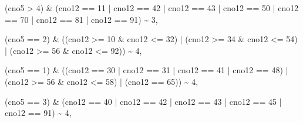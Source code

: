 \documentclass[
]{book}
\newenvironment{Shaded}{\begin{snugshade}}{\end{snugshade}}
\newcommand{\DecValTok}[1]{\textcolor[rgb]{0.00,0.00,0.81}{#1}}
\newcommand{\NormalTok}[1]{#1}
\newcommand{\SpecialCharTok}[1]{\textcolor[rgb]{0.00,0.00,0.00}{#1}}
\begin{document}
\begin{Shaded}
\begin{Highlighting}[]
\NormalTok{                        (cno5 }\SpecialCharTok{\textgreater{}} \DecValTok{4}\NormalTok{) }\SpecialCharTok{\&}\NormalTok{ (cno12 }\SpecialCharTok{==} \DecValTok{11} \SpecialCharTok{|}\NormalTok{ cno12 }\SpecialCharTok{==} \DecValTok{42} \SpecialCharTok{|}\NormalTok{ cno12 }\SpecialCharTok{==} \DecValTok{43} \SpecialCharTok{|} 
\NormalTok{                        cno12 }\SpecialCharTok{==} \DecValTok{50} \SpecialCharTok{|}\NormalTok{ cno12 }\SpecialCharTok{==} \DecValTok{70} \SpecialCharTok{|}\NormalTok{ cno12 }\SpecialCharTok{==} \DecValTok{81} \SpecialCharTok{|}\NormalTok{ cno12 }\SpecialCharTok{==} \DecValTok{91}\NormalTok{) }\SpecialCharTok{\textasciitilde{}} \DecValTok{3}\NormalTok{,}
                        
\NormalTok{                        (cno5 }\SpecialCharTok{==} \DecValTok{2}\NormalTok{) }\SpecialCharTok{\&}\NormalTok{ ((cno12 }\SpecialCharTok{\textgreater{}=} \DecValTok{10} \SpecialCharTok{\&}\NormalTok{ cno12 }\SpecialCharTok{\textless{}=} \DecValTok{32}\NormalTok{) }\SpecialCharTok{|}\NormalTok{ (cno12 }\SpecialCharTok{\textgreater{}=} \DecValTok{34} \SpecialCharTok{\&}\NormalTok{ cno12 }\SpecialCharTok{\textless{}=} \DecValTok{54}\NormalTok{) }\SpecialCharTok{|} 
\NormalTok{                        (cno12 }\SpecialCharTok{\textgreater{}=} \DecValTok{56} \SpecialCharTok{\&}\NormalTok{ cno12 }\SpecialCharTok{\textless{}=} \DecValTok{92}\NormalTok{)) }\SpecialCharTok{\textasciitilde{}} \DecValTok{4}\NormalTok{,}
                        
\NormalTok{                        (cno5 }\SpecialCharTok{==} \DecValTok{1}\NormalTok{) }\SpecialCharTok{\&}\NormalTok{ ((cno12 }\SpecialCharTok{==} \DecValTok{30} \SpecialCharTok{|}\NormalTok{ cno12 }\SpecialCharTok{==} \DecValTok{31} \SpecialCharTok{|}\NormalTok{ cno12 }\SpecialCharTok{==} \DecValTok{41} \SpecialCharTok{|}\NormalTok{ cno12 }\SpecialCharTok{==} \DecValTok{48}\NormalTok{) }\SpecialCharTok{|} 
\NormalTok{                        (cno12 }\SpecialCharTok{\textgreater{}=} \DecValTok{56} \SpecialCharTok{\&}\NormalTok{ cno12 }\SpecialCharTok{\textless{}=} \DecValTok{58}\NormalTok{) }\SpecialCharTok{|}\NormalTok{ (cno12 }\SpecialCharTok{==} \DecValTok{65}\NormalTok{)) }\SpecialCharTok{\textasciitilde{}} \DecValTok{4}\NormalTok{,}
                        
\NormalTok{                        (cno5 }\SpecialCharTok{==} \DecValTok{3}\NormalTok{) }\SpecialCharTok{\&}\NormalTok{ (cno12 }\SpecialCharTok{==} \DecValTok{40} \SpecialCharTok{|}\NormalTok{ cno12 }\SpecialCharTok{==} \DecValTok{42} \SpecialCharTok{|}\NormalTok{ cno12 }\SpecialCharTok{==} \DecValTok{43} \SpecialCharTok{|}\NormalTok{ cno12 }\SpecialCharTok{==} \DecValTok{45} \SpecialCharTok{|} 
\NormalTok{                        cno12 }\SpecialCharTok{==} \DecValTok{91}\NormalTok{) }\SpecialCharTok{\textasciitilde{}} \DecValTok{4}\NormalTok{,}
                        

\end{Highlighting}
\end{Shaded}
\end{document}
